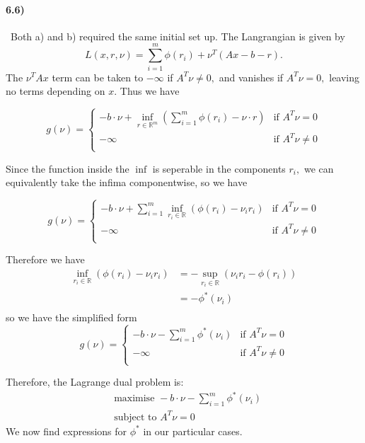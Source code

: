 \documentclass[a4paper,12pt]{article}
\begin{document}
\paragraph{6.6)}
\
Both a) and b) required the same initial set up. The Langrangian is given by $$ L(x,r,\nu) = \sum_{i=1}^m \phi(r_i) + \nu^T (Ax-b-r).$$ The $\nu^TAx$ term can be taken to $-\infty$ if $A^T\nu\neq 0,$ and vanishes if $A^T\nu = 0,$ leaving no terms depending on $x.$ Thus we have

\[
  g(\nu) =
  \begin{cases}
                                   -b\cdot\nu + \inf_{r\in\mathbb{R}^m} \left( \sum_{i=1}^m \phi(r_i) - \nu \cdot r\right) & \text{if }A^T\nu= 0 \\
                                   -\infty & \text{if }A^T\nu\neq 0 \\
  \end{cases}
\]

Since the function inside the $\inf$ is seperable in the components $r_i,$ we can equivalently take the infima componentwise, so we have 

\[
  g(\nu) =
  \begin{cases}
                                   -b\cdot\nu + \sum_{i=1}^m \inf_{r_i\in\mathbb{R}}\left(  \phi(r_i) - \nu_i r_i\right) & \text{if }A^T\nu= 0 \\
                                   -\infty & \text{if }A^T\nu\neq 0 \\
  \end{cases}
\]

Therefore we have 
\begin{align*}
\inf_{r_i\in\mathbb{R}}\left(  \phi(r_i) - \nu_i r_i \right) &= - \sup_{r_i \in \mathbb{R}} (\nu_i r_i - \phi(r_i)) \\
              &= - \phi^*(\nu_i) \\ 
\end{align*}
so we have the simplified form 
\[
  g(\nu) =
  \begin{cases}
                                   -b\cdot\nu - \sum_{i=1}^m \phi^*(\nu_i) & \text{if }A^T\nu= 0 \\
                                   -\infty & \text{if }A^T\nu\neq 0 \\
  \end{cases}
\]

Therefore, the Lagrange dual problem is:
\begin{align*}
 &\text{maximise } -b\cdot \nu - \sum_{i=1}^m \phi^*(\nu_i) \\
 &\text{subject to } A^T\nu = 0
\end{align*}
We now find expressions for $\phi^*$ in our particular cases. 
\end{document}
